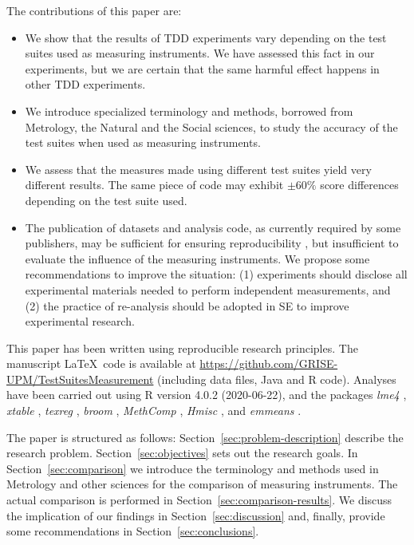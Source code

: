 The contributions of this paper are:
\begin{itemize}

\item We show that the results of TDD experiments vary depending on the test suites used as measuring instruments. We have assessed this fact in our experiments, but we are certain that the same harmful effect happens in other TDD experiments.

\item We introduce specialized terminology and methods, borrowed from Metrology, the Natural and the Social sciences, to study the accuracy of the test suites when used as measuring instruments.

\item We assess that the measures made using different test suites yield very different results. The same piece of code may exhibit $\pm 60\%$ score differences depending on the test suite used.

\item The publication of datasets and analysis code, as currently required by some publishers, may be sufficient for ensuring reproducibility \cite{NAP25303,fernandez2019open}, but insufficient to evaluate the influence of the measuring instruments. We propose some recommendations to improve the situation: (1) experiments should disclose all experimental materials needed to perform independent measurements, and (2) the practice of re-analysis \cite{mittelstaedt1984econometric,IJzendoorn1994} should be adopted in SE to improve experimental research. 

\end{itemize}

This paper has been written using reproducible research principles. The manuscript \LaTeX~code  is available at \url{https://github.com/GRISE-UPM/TestSuitesMeasurement} (including data files, Java and R code). Analyses have been carried out using R \cite{R} version 4.0.2 (2020-06-22), and the packages \textit{lme4} \cite{lme4}, \textit{xtable} \cite{xtable}, \textit{texreg} \cite{texreg}, \textit{broom} \cite{broom}, \textit{MethComp} \cite{MethComp}, \textit{Hmisc} \cite{Hmisc}, and  \textit{emmeans} \cite{emmeans}.

The paper is structured as follows: Section~\ref{sec:problem-description} describe the research problem. Section~\ref{sec:objectives} sets out the research goals. In Section~\ref{sec:comparison} we introduce the terminology and methods used in Metrology and other sciences for the comparison of measuring instruments. The actual comparison is performed in Section~\ref{sec:comparison-results}. We discuss the implication of our findings in Section~\ref{sec:discussion} and, finally, provide some recommendations in Section~\ref{sec:conclusions}.